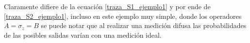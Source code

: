 Claramente difiere de la ecuación {\ref{traza_S1_ejemplo1}} y por ende de {\ref{traza_S2_ejemplo1}}, incluso en este ejemplo muy simple, donde los operadores $A=\sigma _z=B$ se puede notar que al realizar una medición difusa las probabilidades de las posibles salidas varían con una medición ideal.  